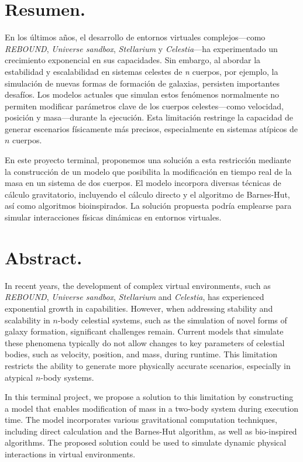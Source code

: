 \chapter{Resumen.}
\justifying%
En los últimos años, el desarrollo de entornos virtuales complejos—como \textit{REBOUND}, \textit{Universe sandbox}, \textit{Stellarium} y \textit{Celestia}—ha experimentado un crecimiento exponencial en sus capacidades. Sin embargo, al abordar la estabilidad y escalabilidad en sistemas celestes de \textit{n} cuerpos, por ejemplo, la simulación de nuevas formas de formación de galaxias, persisten importantes desafíos. Los modelos actuales que simulan estos fenómenos normalmente no permiten modificar parámetros clave de los cuerpos celestes—como velocidad, posición y masa—durante la ejecución. Esta limitación restringe la capacidad de generar escenarios físicamente más precisos, especialmente en sistemas atípicos de $n$ cuerpos.

En este proyecto terminal, proponemos una solución a esta restricción mediante la construcción de un modelo que posibilita la modificación en tiempo real de la masa en un sistema de dos cuerpos. El modelo incorpora diversas técnicas de cálculo gravitatorio, incluyendo el cálculo directo y el algoritmo de Barnes-Hut, así como algoritmos bioinspirados. La solución propuesta podría emplearse para simular interacciones físicas dinámicas en entornos virtuales.

\chapter{Abstract.}
In recent years, the development of complex virtual environments, such as \textit{REBOUND}, \textit{Universe sandbox}, \textit{Stellarium} and \textit{Celestia}, has experienced exponential growth in capabilities. However, when addressing stability and scalability in $n$-body celestial systems, such as the simulation of novel forms of galaxy formation, significant challenges remain. Current models that simulate these phenomena typically do not allow changes to key parameters of celestial bodies, such as velocity, position, and mass, during runtime. This limitation restricts the ability to generate more physically accurate scenarios, especially in atypical $n$-body systems.

In this terminal project, we propose a solution to this limitation by constructing a model that enables modification of mass in a two-body system during execution time. The model incorporates various gravitational computation techniques, including direct calculation and the Barnes-Hut algorithm, as well as bio-inspired algorithms. The proposed solution could be used to simulate dynamic physical interactions in virtual environments.
